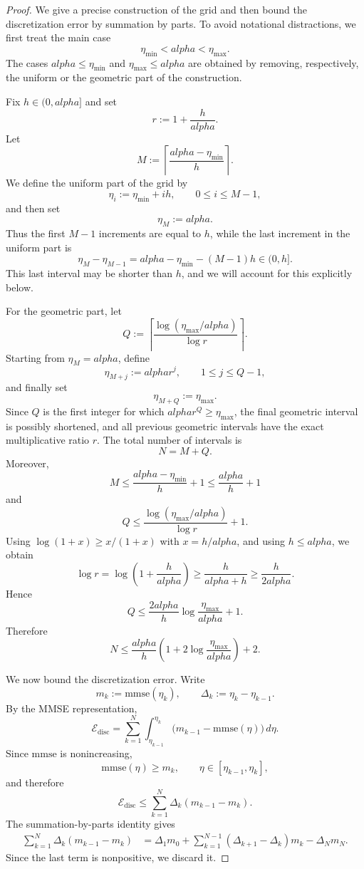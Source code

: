 \documentclass[10pt,a4paper]{amsart}
\def\alpha{alpha}%
\newcommand{\mmse}{\mathrm{mmse}}
\begin{document}
\begin{proof}
We give a precise construction of the grid and then bound the discretization error by summation by parts. To avoid notational distractions, we first treat the main case
\[
    \eta_{\min}<\alpha<\eta_{\max}.
\]
The cases $\alpha\le \eta_{\min}$ and $\eta_{\max}\le\alpha$ are obtained by removing, respectively, the uniform or the geometric part of the construction.

Fix $h\in(0,\alpha]$ and set
\[
    r:=1+\frac{h}{\alpha}.
\]
Let
\[
    M:=\left\lceil \frac{\alpha-\eta_{\min}}{h}\right\rceil .
\]
We define the uniform part of the grid by
\[
    \eta_i:=\eta_{\min}+ih,
    \qquad
    0\le i\le M-1,
\]
and then set
\[
    \eta_M:=\alpha.
\]
Thus the first $M-1$ increments are equal to $h$, while the last increment in the uniform part is
\[
    \eta_M-\eta_{M-1}
    =
    \alpha-\eta_{\min}-(M-1)h
    \in(0,h].
\]
This last interval may be shorter than $h$, and we will account for this explicitly below.

For the geometric part, let
\[
    Q:=\left\lceil
    \frac{\log(\eta_{\max}/\alpha)}{\log r}
    \right\rceil .
\]
Starting from $\eta_M=\alpha$, define
\[
    \eta_{M+j}:=\alpha r^j,
    \qquad
    1\le j\le Q-1,
\]
and finally set
\[
    \eta_{M+Q}:=\eta_{\max}.
\]
Since $Q$ is the first integer for which $\alpha r^Q\ge \eta_{\max}$, the final geometric interval is possibly shortened, and all previous geometric intervals have the exact multiplicative ratio $r$. The total number of intervals is
\[
    N=M+Q .
\]
Moreover,
\[
    M\le \frac{\alpha-\eta_{\min}}{h}+1
    \le \frac{\alpha}{h}+1
\]
and
\[
    Q\le
    \frac{\log(\eta_{\max}/\alpha)}{\log r}+1 .
\]
Using $\log(1+x)\ge x/(1+x)$ with $x=h/\alpha$, and using $h\le \alpha$, we obtain
\[
    \log r
    =
    \log\left(1+\frac{h}{\alpha}\right)
    \ge
    \frac{h}{\alpha+h}
    \ge
    \frac{h}{2\alpha}.
\]
Hence
\[
    Q
    \le
    \frac{2\alpha}{h}
    \log\frac{\eta_{\max}}{\alpha}
    +1 .
\]
Therefore
\[
    N
    \le
    \frac{\alpha}{h}
    \left(
    1+2\log\frac{\eta_{\max}}{\alpha}
    \right)
    +2 .
\]

We now bound the discretization error. Write
\[
    m_k:=\mmse(\eta_k),
    \qquad
    \Delta_k:=\eta_k-\eta_{k-1}.
\]
By the MMSE representation,
\[
    \mathcal E_{\mathrm{disc}}
    =
    \sum_{k=1}^N
    \int_{\eta_{k-1}}^{\eta_k}
    \bigl(m_{k-1}-\mmse(\eta)\bigr)\,d\eta .
\]
Since $\mmse$ is nonincreasing,
\[
    \mmse(\eta)\ge m_k,
    \qquad
    \eta\in[\eta_{k-1},\eta_k],
\]
and therefore
\[
    \mathcal E_{\mathrm{disc}}
    \le
    \sum_{k=1}^N
    \Delta_k(m_{k-1}-m_k).
\]
The summation-by-parts identity gives
\[
\begin{aligned}
    \sum_{k=1}^N
    \Delta_k(m_{k-1}-m_k)
    &=
    \Delta_1m_0
    +
    \sum_{k=1}^{N-1}
    (\Delta_{k+1}-\Delta_k)m_k
    -
    \Delta_Nm_N .
\end{aligned}
\]
Since the last term is nonpositive, we discard it.


\end{proof}
\end{document}
